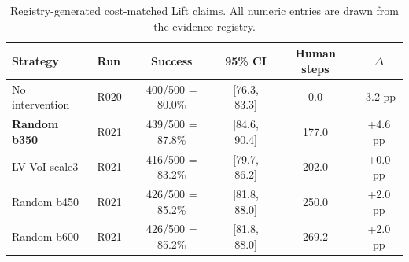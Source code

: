 \begin{table}[t]
\centering
\caption{Registry-generated cost-matched Lift claims. All numeric entries are drawn from the evidence registry.}
\label{tab:registry_costmatched_claims}
\begin{tabular}{llcccc}
\toprule
Strategy & Run & Success & 95\% CI & Human steps & $\Delta$ \\
\midrule
No intervention & R020 & 400/500 = 80.0\% & [76.3, 83.3] & 0.0 & -3.2 pp \\
\textbf{Random b350} & R021 & 439/500 = 87.8\% & [84.6, 90.4] & 177.0 & +4.6 pp \\
LV-VoI scale3 & R021 & 416/500 = 83.2\% & [79.7, 86.2] & 202.0 & +0.0 pp \\
Random b450 & R021 & 426/500 = 85.2\% & [81.8, 88.0] & 250.0 & +2.0 pp \\
Random b600 & R021 & 426/500 = 85.2\% & [81.8, 88.0] & 269.2 & +2.0 pp \\
\bottomrule
\end{tabular}
\end{table}
